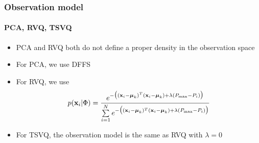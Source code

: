 \begin{frame}
\frametitle{Observation model}
\framesubtitle{PCA, RVQ, TSVQ}
\logoCSIPCPL\mypagenum
\begin{itemize}
\item PCA and RVQ both do not define a proper density in the observation space
\item For PCA, we use DFFS
\item For RVQ, we use
\begin{equation}
p(\mathbf{x}_i|\Phi) = \frac{e^{-\big((\mathbf{x}_i-\boldsymbol\mu_k)^T(\mathbf{x}_i-\boldsymbol\mu_k) + \lambda({P_{\textrm{max}}-P_i})\big)}} {\sum\limits_{i=1}^N e^{-\big((\mathbf{x}_i-\boldsymbol\mu_k)^T(\mathbf{x}_i-\boldsymbol\mu_k) + \lambda({P_{\textrm{max}}-P_i})\big)}}
\end{equation}
\item For TSVQ, the observation model is the same as RVQ with $\lambda=0$
\end{itemize}
\end{frame}


